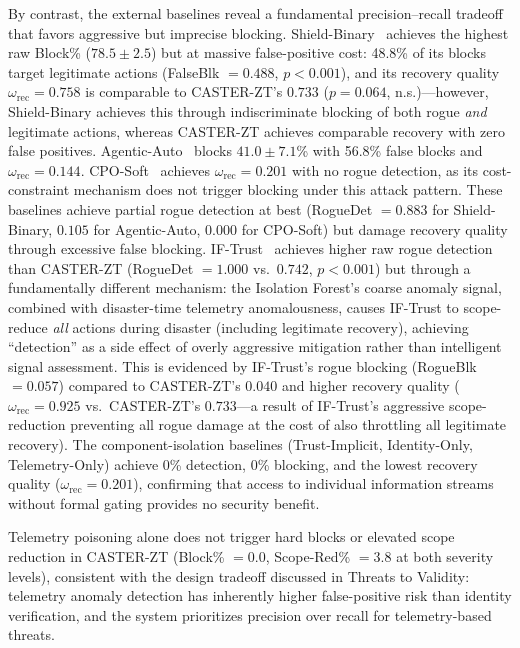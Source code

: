 \documentclass[10pt,journal,compsoc]{IEEEtran}
\begin{document}
By contrast, the external baselines reveal a fundamental precision--recall tradeoff that favors aggressive but imprecise blocking.
Shield-Binary~\cite{alshiekh2018shielding} achieves the highest raw Block\% ($78.5\pm2.5$) but at massive false-positive cost: 48.8\% of its blocks target legitimate actions (FalseBlk $= 0.488$, $p < 0.001$), and its recovery quality $\omega_{\mathrm{rec}} = 0.758$ is comparable to CASTER-ZT's $0.733$ ($p = 0.064$, n.s.)---however, Shield-Binary achieves this through indiscriminate blocking of both rogue \emph{and} legitimate actions, whereas CASTER-ZT achieves comparable recovery with zero false positives.
Agentic-Auto~\cite{toward_autonomous_oran_2026} blocks $41.0\pm7.1$\% with 56.8\% false blocks and $\omega_{\mathrm{rec}} = 0.144$.
CPO-Soft~\cite{achiam2017cpo} achieves $\omega_{\mathrm{rec}} = 0.201$ with no rogue detection, as its cost-constraint mechanism does not trigger blocking under this attack pattern.
These baselines achieve partial rogue detection at best (RogueDet $= 0.883$ for Shield-Binary, $0.105$ for Agentic-Auto, $0.000$ for CPO-Soft) but damage recovery quality through excessive false blocking.
IF-Trust~\cite{zahoor2025ifocsvm} achieves higher raw rogue detection than CASTER-ZT (RogueDet $= 1.000$ vs.\ $0.742$, $p < 0.001$) but through a fundamentally different mechanism: the Isolation Forest's coarse anomaly signal, combined with disaster-time telemetry anomalousness, causes IF-Trust to scope-reduce \emph{all} actions during disaster (including legitimate recovery), achieving ``detection'' as a side effect of overly aggressive mitigation rather than intelligent signal assessment.
This is evidenced by IF-Trust's rogue blocking (RogueBlk $= 0.057$) compared to CASTER-ZT's $0.040$ and higher recovery quality ($\omega_{\mathrm{rec}} = 0.925$ vs.\ CASTER-ZT's $0.733$---a result of IF-Trust's aggressive scope-reduction preventing all rogue damage at the cost of also throttling all legitimate recovery).
The component-isolation baselines (Trust-Implicit, Identity-Only, Telemetry-Only) achieve 0\% detection, 0\% blocking, and the lowest recovery quality ($\omega_{\mathrm{rec}} = 0.201$), confirming that access to individual information streams without formal gating provides no security benefit.

Telemetry poisoning alone does not trigger hard blocks or elevated scope reduction in CASTER-ZT (Block\% $= 0.0$, Scope-Red\% $= 3.8$ at both severity levels), consistent with the design tradeoff discussed in Threats to Validity: telemetry anomaly detection has inherently higher false-positive risk than identity verification, and the system prioritizes precision over recall for telemetry-based threats.
\end{document}
